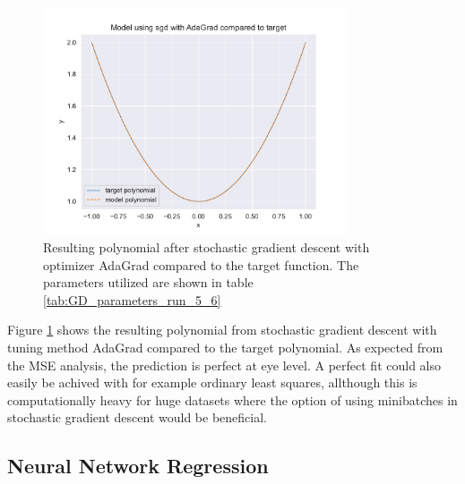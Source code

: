 \begin{figure}[H]
\centering
\includegraphics[width=0.8\textwidth]{Figures/PartA/sgd_polynomial_fit}
\caption{Resulting polynomial after stochastic gradient descent with optimizer AdaGrad compared to the target function.
 The parameters utilized are shown in table \ref{tab:GD_parameters_run_5_6}}
\label{fig:sgd_polynomial_fit}
\end{figure}

Figure \ref{fig:sgd_polynomial_fit} shows the resulting polynomial from stochastic gradient descent with tuning method AdaGrad compared 
to the target polynomial. As expected from the MSE analysis, the prediction is perfect at eye level. A perfect fit could also easily be achived 
with for example ordinary least squares, allthough this is computationally heavy for huge datasets where the option of using minibatches in 
stochastic gradient descent would be beneficial. 

\subsection{Neural Network Regression}

